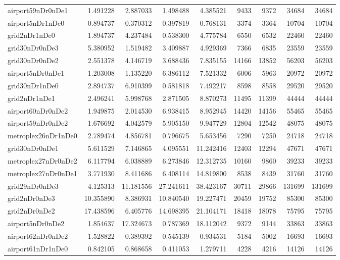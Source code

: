 \begin{longtable}{|l|r|r|r|r|r|r|r|r|}
airport59nDr0nDe1 & 1.491228 & 2.887033 & 1.498488 & 4.385521 & 9433 & 9372 & 34684 & 34684 \\
airport5nDr1nDe0 & 0.894737 & 0.370312 & 0.397819 & 0.768131 & 3374 & 3364 & 10704 & 10704 \\
grid2nDr1nDe0 & 1.894737 & 4.237484 & 0.538300 & 4.775784 & 6550 & 6532 & 22460 & 22460 \\
grid30nDr0nDe3 & 5.380952 & 1.519482 & 3.409887 & 4.929369 & 7366 & 6835 & 23559 & 23559 \\
grid30nDr0nDe2 & 2.551378 & 4.146719 & 3.688436 & 7.835155 & 14166 & 13852 & 56203 & 56203 \\
airport5nDr0nDe1 & 1.203008 & 1.135220 & 6.386112 & 7.521332 & 6006 & 5963 & 20972 & 20972 \\
grid30nDr1nDe0 & 2.894737 & 6.910399 & 0.581818 & 7.492217 & 8598 & 8558 & 29520 & 29520 \\
grid2nDr1nDe1 & 2.496241 & 5.998768 & 2.871505 & 8.870273 & 11495 & 11399 & 44444 & 44444 \\
airport60nDr0nDe2 & 1.949875 & 2.014530 & 6.938415 & 8.952945 & 14420 & 14156 & 55465 & 55465 \\
airport59nDr0nDe2 & 1.676692 & 4.042579 & 5.905150 & 9.947729 & 12804 & 12542 & 48075 & 48075 \\
metroplex26nDr1nDe0 & 2.789474 & 4.856781 & 0.796675 & 5.653456 & 7290 & 7250 & 24718 & 24718 \\
grid30nDr0nDe1 & 5.611529 & 7.146865 & 4.095551 & 11.242416 & 12403 & 12294 & 47671 & 47671 \\
metroplex27nDr0nDe2 & 6.117794 & 6.038889 & 6.273846 & 12.312735 & 10160 & 9860 & 39233 & 39233 \\
metroplex27nDr0nDe1 & 3.771930 & 8.411686 & 6.408114 & 14.819800 & 8538 & 8439 & 31760 & 31760 \\
grid29nDr0nDe3 & 4.125313 & 11.181556 & 27.241611 & 38.423167 & 30711 & 29866 & 131699 & 131699 \\
grid2nDr0nDe3 & 10.355890 & 8.386931 & 10.840540 & 19.227471 & 20459 & 19752 & 85300 & 85300 \\
grid2nDr0nDe2 & 17.438596 & 6.405776 & 14.698395 & 21.104171 & 18418 & 18078 & 75795 & 75795 \\
airport5nDr0nDe2 & 1.854637 & 17.324673 & 0.787369 & 18.112042 & 9372 & 9144 & 33863 & 33863 \\
airport62nDr0nDe2 & 1.528822 & 0.389392 & 0.545139 & 0.934531 & 5184 & 5002 & 16693 & 16693 \\
airport61nDr1nDe0 & 0.842105 & 0.868658 & 0.411053 & 1.279711 & 4228 & 4216 & 14126 & 14126 \\

\end{longtable}
